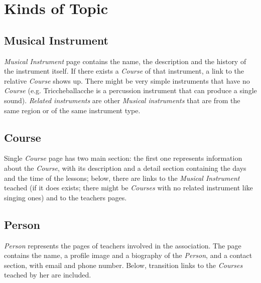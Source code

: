 \documentclass[../../DD.tex]{subfiles}
\begin{document}
\newpage
\section{Kinds of Topic}
	\subsection{Musical Instrument}
		\textit{Musical Instrument} page contains the name, the description and the history of the instrument itself. If there exists a \textit{Course} of that instrument, a link to the relative \textit{Course} shows up. There might be very simple instruments that have no \textit{Course} (e.g. Triccheballacche is a percussion instrument that can produce a single sound). \textit{Related instruments} are other \textit{Musical instruments} that are from the same region or of the same instrument type.
		\newline

	\newpage
	\subsection{Course}
		Single \textit{Course} page has two main section: the first one represents information about the \textit{Course}, with its description and a detail section containing the days and the time of the lessons; below, there are links to the \textit{Musical Instrument} teached (if it does exists; there might be \textit{Courses} with no related instrument like singing ones) and to the teachers pages.  
		\newline

	\newpage
	\subsection{Person}
		\textit{Person} represents the pages of teachers involved in the association. The page contains the name, a profile image and a biography of the \textit{Person}, and a contact section, with email and phone number. Below, transition links to the \textit{Courses} teached by her are included.
		\newline
\end{document}
